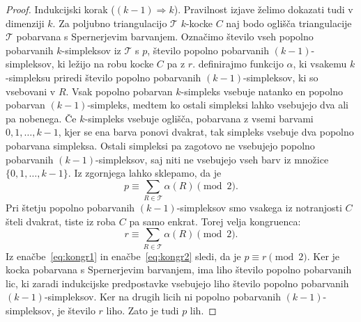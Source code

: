\documentclass[mat1]{fmfdelo}
\newcommand{\0}{\underline{0}}
\newcommand{\pT}{\mathcal T}
\begin{document}
\begin{proof}
Indukcijski korak ($(k - 1) \Longrightarrow k$).
Pravilnost izjave želimo dokazati tudi v dimenziji $k$. Za poljubno triangulacijo $\pT$ $k$-kocke $C$ naj bodo oglišča triangulacije $\pT$ pobarvana s Spernerjevim barvanjem. Označimo število vseh popolno pobarvanih $k$-simpleksov iz $\pT$ s $p$, število popolno pobarvanih $(k-1)$-simpleksov, ki ležijo na robu kocke $C$ pa z $r$. definirajmo funkcijo $\alpha$, ki vsakemu $k$-simpleksu priredi število popolno pobarvanih $(k-1)$-simpleksov, ki so vsebovani v $R$. Vsak popolno pobarvan $k$-simpleks vsebuje natanko en popolno pobarvan $(k-1)$-simpleks, medtem ko ostali simpleksi lahko vsebujejo dva ali pa nobenega. Če $k$-simpleks vsebuje oglišča, pobarvana z vsemi barvami $0, 1, \dots, k-1$, kjer se ena barva ponovi dvakrat, tak simpleks vsebuje dva popolno pobarvana simpleksa. Ostali simpleksi pa zagotovo ne vsebujejo popolno pobarvanih $(k - 1)$-simpleksov, saj niti ne vsebujejo vseh barv iz množice $\{0, 1, \dots, k-1 \}$. Iz zgornjega lahko sklepamo, da je
\begin{equation}\label{eq:kongr1}
p \equiv \sum\limits_{R \in \pT} \alpha(R) \pmod 2.
\end{equation}
Pri štetju popolno pobarvanih $(k - 1)$-simpleksov smo vsakega iz notranjosti $C$ šteli dvakrat, tiste iz roba $C$ pa samo enkrat. Torej velja kongruenca:
\begin{equation}\label{eq:kongr2}
r \equiv \sum\limits_{R \in \pT} \alpha(R) \pmod 2.
\end{equation}
Iz enačbe~\eqref{eq:kongr1} in enačbe~\eqref{eq:kongr2} sledi, da je $p \equiv r \pmod 2$.
Ker je kocka pobarvana s Spernerjevim barvanjem, ima liho število popolno pobarvanih lic, ki zaradi indukcijske predpostavke vsebujejo liho število popolno pobarvanih $(k - 1)$-simpleksov. Ker na drugih licih ni popolno pobarvanih $(k - 1)$-simpleksov, je število $r$ liho. Zato je tudi $p$ lih.
\end{proof}
\end{document}
